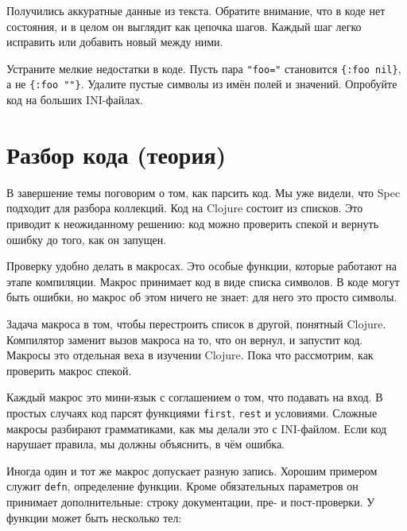 Получились аккуратные данные из текста. Обратите внимание, что в коде нет
состояния, и в целом он выглядит как цепочка шагов. Каждый шаг легко исправить
или добавить новый между ними.

Устраните мелкие недостатки в коде. Пусть пара \verb|"foo="| становится
\verb|{:foo nil}|, а не \verb|{:foo ""}|.  Удалите пустые символы из
имён полей и значений. Опробуйте код на больших INI-файлах.

\section{Разбор кода (теория)}


В завершение темы поговорим о том, как парсить код. Мы уже видели, что Spec
подходит для разбора коллекций. Код на Clojure состоит из списков. Это приводит
к неожиданному решению: код можно проверить спекой и вернуть ошибку до того, как
он запущен.

Проверку удобно делать в макросах. Это особые функции, которые работают на этапе
компиляции. Макрос принимает код в виде списка символов. В коде могут быть
ошибки, но макрос об этом ничего не знает: для него это просто символы.

Задача макроса в том, чтобы перестроить список в другой, понятный
Clojure. Компилятор заменит вызов макроса на то, что он вернул, и запустит
код. Макросы это отдельная веха в изучении Clojure. Пока что рассмотрим, как
проверить макрос спекой.

Каждый макрос это мини-язык с соглашением о том, что подавать на вход. В простых
случаях код парсят функциями \verb|first|, \verb|rest| и условиями. Сложные
макросы разбирают грамматиками, как мы делали это с INI-файлом. Если код
нарушает правила, мы должны объяснить, в чём ошибка.


Иногда один и тот же макрос допускает разную запись. Хорошим примером служит
\verb|defn|, определение функции. Кроме обязательных параметров он принимает
дополнительные: строку документации, пре- и пост-проверки. У функции может быть
несколько тел:

